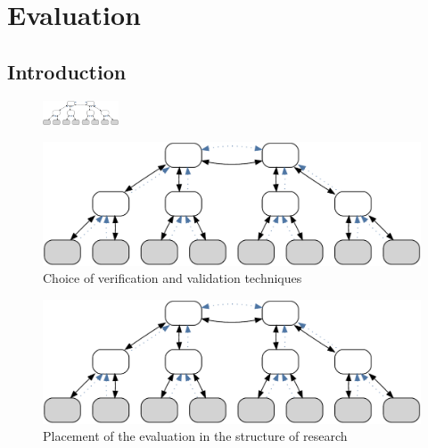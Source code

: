\chapter{Evaluation}\label{sec:eval}\minitoc\vspace{.5cm}

\section{Introduction}

\begin{figure}
    \centering
    \includegraphics[width=0.2\textwidth]{resources/images/example3}
\end{figure}


\begin{figure}[htbp]
    \centering
    \includegraphics[width=.8\textwidth]{resources/images/example3}
    \caption{Choice of verification and validation techniques~\cite{li2002design}}\label{sec:eval:tec}
\end{figure}



\begin{figure}[htpb]
    \centering
    \includegraphics[width=.55\textwidth]{resources/images/example3}
    \caption{Placement of the evaluation in the structure of research}\label{fig:hourglass:evaluation}
\end{figure}

